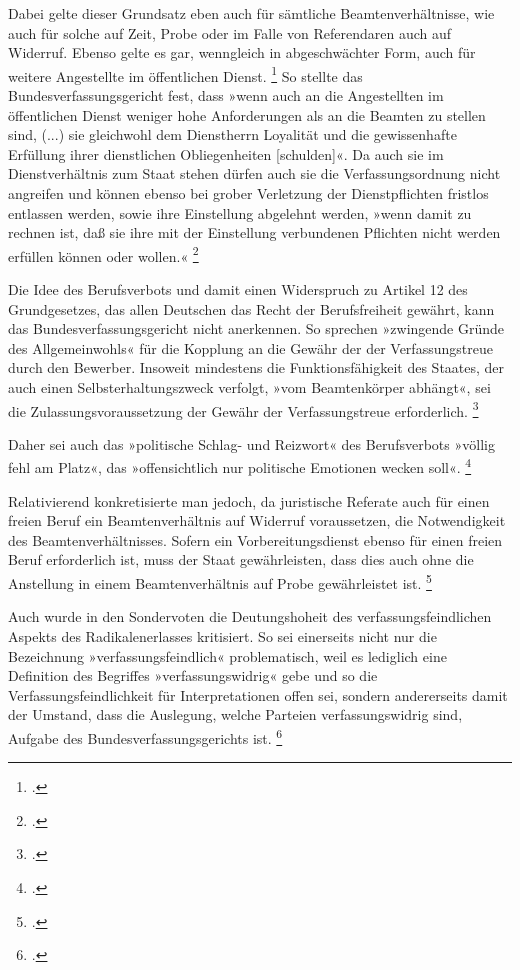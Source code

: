 \documentclass[12pt]{scrartcl}
\begin{document}
Dabei gelte dieser Grundsatz eben auch für sämtliche Beamtenverhältnisse, wie auch für solche auf Zeit, Probe oder im Falle von Referendaren auch auf Widerruf. Ebenso gelte es gar, wenngleich in abgeschwächter Form, auch für weitere Angestellte im öffentlichen Dienst. \footcite[][S. 268]{edgar_wolfrum_verfassungsfeinde_2022}
So stellte das Bundesverfassungsgericht fest, dass »wenn auch an die Angestellten im öffentlichen Dienst weniger hohe Anforderungen als an die Beamten zu stellen sind, (...) sie gleichwohl dem Dienstherrn Loyalität und die gewissenhafte Erfüllung ihrer dienstlichen Obliegenheiten [schulden]«. Da auch sie im Dienstverhältnis zum Staat stehen dürfen auch sie die Verfassungsordnung nicht angreifen und können ebenso bei grober Verletzung der Dienstpflichten fristlos entlassen werden, sowie ihre Einstellung abgelehnt werden, »wenn damit zu rechnen ist, daß sie ihre mit der Einstellung verbundenen Pflichten nicht werden erfüllen können oder wollen.« \footcite[][Abs. 7]{noauthor_bverfge_nodate}

Die Idee des Berufsverbots und damit einen Widerspruch zu Artikel 12 des Grundgesetzes, das allen Deutschen das Recht der Berufsfreiheit gewährt, kann das Bundesverfassungsgericht nicht anerkennen. So sprechen »zwingende Gründe des Allgemeinwohls« für die Kopplung an die Gewähr der der Verfassungstreue durch den Bewerber. Insoweit mindestens die Funktionsfähigkeit des Staates, der auch einen Selbsterhaltungszweck verfolgt, »vom Beamtenkörper abhängt«, sei die Zulassungsvoraussetzung der Gewähr der Verfassungstreue erforderlich. \footcite[][Ziffer III, Abs. 4b]{noauthor_bverfge_nodate}

Daher sei auch das »politische Schlag- und Reizwort« des Berufsverbots »völlig fehl am Platz«, das »offensichtlich nur politische Emotionen wecken soll«. \footcite[][Ziffer III, Abs. 4b]{noauthor_bverfge_nodate}

Relativierend konkretisierte man jedoch, da juristische Referate auch für einen freien Beruf ein Beamtenverhältnis auf Widerruf voraussetzen, die Notwendigkeit des Beamtenverhältnisses. Sofern ein Vorbereitungsdienst ebenso für einen freien Beruf erforderlich ist, muss der Staat gewährleisten, dass dies auch ohne die Anstellung in einem Beamtenverhältnis auf Probe gewährleistet ist. \footcite[][Abs. 11]{noauthor_bverfge_nodate}

Auch wurde in den Sondervoten die Deutungshoheit des verfassungsfeindlichen Aspekts des Radikalenerlasses kritisiert. So sei einerseits nicht nur die Bezeichnung »verfassungsfeindlich« problematisch, weil es lediglich eine Definition des Begriffes »verfassungswidrig« gebe und so die Verfassungsfeindlichkeit für Interpretationen offen sei, sondern andererseits damit der Umstand, dass die Auslegung, welche Parteien verfassungswidrig sind, Aufgabe des Bundesverfassungsgerichts ist. \footcite[][S. 269]{edgar_wolfrum_verfassungsfeinde_2022}
\end{document}
